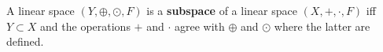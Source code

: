 A linear space $(Y, \oplus, \odot, F)$ is a \textbf{subspace} of a linear space $(X, +, \cdot, F)$ iff $Y \subset X$ and the operations $+$ and $\cdot$ agree with $\oplus$ and $\odot$ where the latter are defined.
